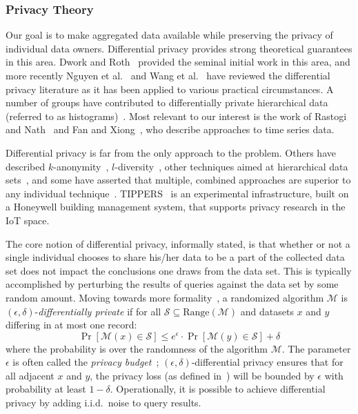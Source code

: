 \subsubsection{Privacy Theory}

Our goal is to make aggregated data available while preserving the
privacy of individual data owners.  Differential privacy
provides strong theoretical guarantees in this area.  Dwork and
Roth~\cite{dwork11,dr14} provided the seminal initial work in this
area, and more recently Nguyen et al.~\cite{nkk13} and
Wang et al.~\cite{wll15} have reviewed the differential
privacy literature as it has been applied to various practical circumstances.
A number of groups have contributed to differentially private hierarchical data
(referred to as histograms)~\cite{hrms10,xxy10}.
Most relevant to our interest is the work of
Rastogi and Nath~\cite{rn10} and
Fan and Xiong~\cite{fx12,fx14}, who describe approaches to time series data.

Differential privacy is far from the only approach to the problem.
Others have described $k$-anonymity~\cite{samarati01,sweeney02},
$l$-diversity~\cite{mkgv07},
other techniques aimed at hierarchical data sets~\cite{lnpr14}, and some
have asserted that multiple, combined approaches are superior to any
individual technique~\cite{ct13}.
TIPPERS~\cite{tippers} is an experimental infrastructure, built on a
Honeywell building management system, that supports privacy research
in the IoT space.

The core notion of differential privacy, informally stated, is that whether
or not a single individual chooses to share his/her data to be a part of
the collected data set does not impact the conclusions one draws from
the data set.
This is typically accomplished by perturbing the results of queries
against the data set by some random amount.
Moving towards more formality~\cite{dr14}, a randomized algorithm $\mathcal{M}$
is $(\epsilon,\delta)$-\emph{differentially private} if for all
$\mathcal{S} \subseteq \mbox{Range}(\mathcal{M})$ and datasets $x$ and $y$
differing in at most one record:
\begin{equation}
\Pr[\mathcal{M}(x) \in \mathcal{S}] \leq e^\epsilon \cdot \Pr[\mathcal{M}(y)
\in \mathcal{S}] + \delta
\label{eqn:dp}
\end{equation}
where the probability is over the randomness of the algorithm $\mathcal{M}$.
The parameter $\epsilon$ is often called the
\emph{privacy budget}~\cite{McSherry09}; $(\epsilon,\delta)$-differential
privacy ensures that for all adjacent $x$ and $y$, the privacy loss
(as defined in~\cite{dr14}) will
be bounded by $\epsilon$ with probability at least $1-\delta$.
Operationally, it is possible to achieve differential privacy by adding
i.i.d.~noise to query results.

